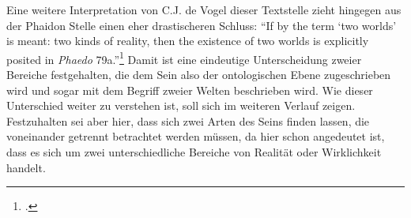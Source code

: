 Eine weitere Interpretation von C.J. de Vogel dieser Textstelle zieht hingegen aus der Phaidon Stelle einen eher drastischeren Schluss:
\enquote{If by the term \enquote{two worlds} is meant: two kinds of reality, then the existence of two worlds is explicitly posited in \emph{Phaedo} 79a.}\footcite[][S. 161]{Vogel}
Damit ist eine eindeutige Unterscheidung zweier Bereiche festgehalten, die dem Sein also der ontologischen Ebene zugeschrieben wird und sogar mit dem Begriff zweier Welten beschrieben wird. Wie dieser Unterschied weiter zu verstehen ist, soll sich im weiteren Verlauf zeigen. Festzuhalten sei aber hier, dass sich zwei Arten des Seins finden lassen, die voneinander getrennt betrachtet werden müssen, da hier schon angedeutet ist, dass es sich um zwei unterschiedliche Bereiche von Realität oder Wirklichkeit handelt.

